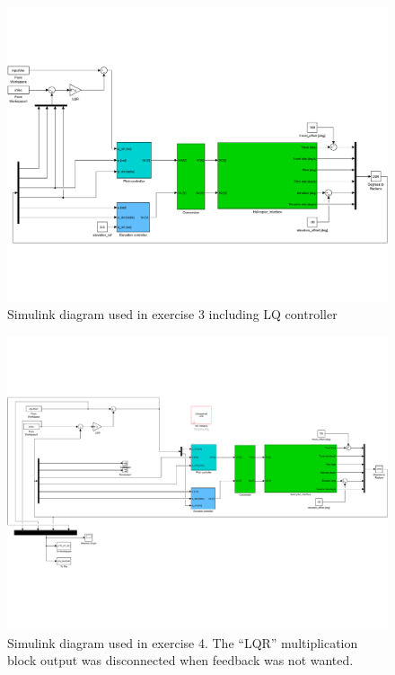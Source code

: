 \begin{appendices}
\begin{figure}[H]

    \includegraphics[width=\textwidth]{ex3sim.pdf}

    \caption{Simulink diagram used in exercise 3 including LQ controller}

    \label{fig:simulink_LQ}

\end{figure}

\begin{figure}[H]

    \includegraphics[width=\textwidth]{ex4sim.pdf}

    \caption{Simulink diagram used in exercise 4. The ``LQR'' multiplication block output was disconnected when feedback was not wanted.}

\end{figure}

\end{appendices}
